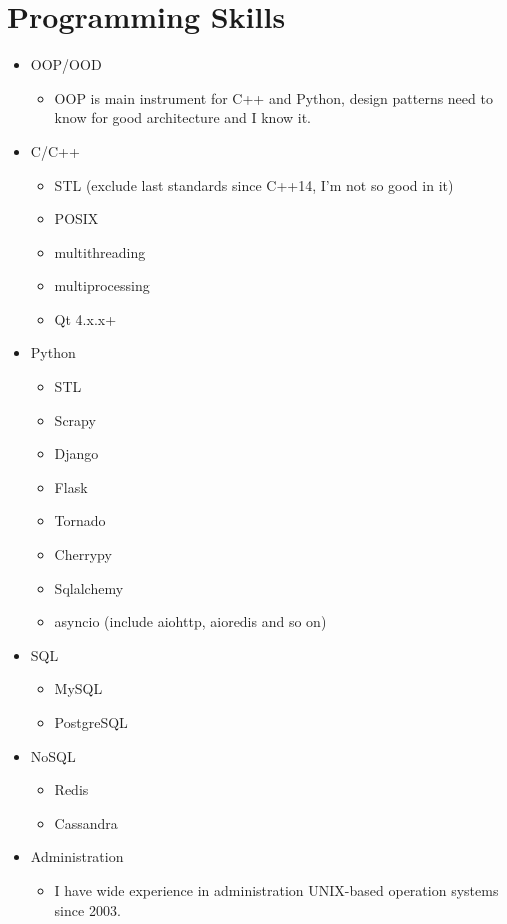 \documentclass[letterpaper,11pt]{article}
\begin{document}
\section{Programming Skills}
  \begin{itemize}
    \item {OOP/OOD}
      \begin{itemize}
        \item OOP is main instrument for C++ and Python, design patterns need to know for good architecture and I know it.
      \end{itemize}
    \item{C/C++}
      \begin{itemize}
	\item STL (exclude last standards since C++14, I'm not so good in it)
	\item POSIX
	\item multithreading
	\item multiprocessing
	\item Qt 4.x.x+
      \end{itemize}
    \item{Python}
      \begin{itemize}
        \item STL
	\item Scrapy
	\item Django
	\item Flask
	\item Tornado
	\item Cherrypy
	\item Sqlalchemy
	\item asyncio (include aiohttp, aioredis and so on)
      \end{itemize}
    \item{SQL}
      \begin{itemize}
        \item MySQL
	\item PostgreSQL
      \end{itemize}
    \item{NoSQL}
      \begin{itemize}
        \item Redis
	\item Cassandra
      \end{itemize}
    \item{Administration}
      \begin{itemize}
        \item I have wide experience in administration UNIX-based operation systems since 2003.
      \end{itemize}
  \end{itemize}
  
\end{document}
